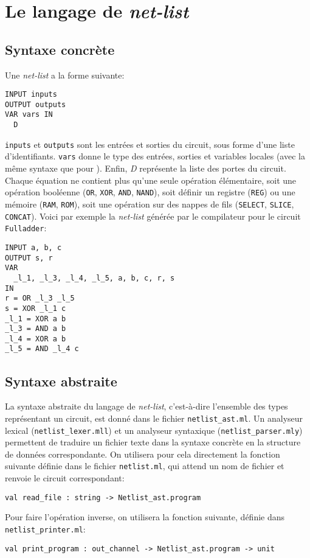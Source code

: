 \documentclass[a4paper]{article}
\begin{document}
\section{Le langage de \emph{net-list}}

\subsection{Syntaxe concrète}

Une \emph{net-list} a la forme suivante:
\begin{lstlisting}[language=nl]
INPUT inputs
OUTPUT outputs
VAR vars IN
  D
\end{lstlisting}
\texttt{inputs} et \texttt{outputs} sont les entrées et sorties du circuit, sous forme d'une liste d'identifiants. \texttt{vars} donne le type des entrées, sorties et variables locales (avec la même syntaxe que pour \minijazz{}). Enfin, \emph{D} représente la liste des portes du circuit. Chaque équation ne contient plus qu'une seule opération élémentaire, soit une opération booléenne (\texttt{OR}, \texttt{XOR}, \texttt{AND}, \texttt{NAND}), soit définir un registre (\texttt{REG}) ou une mémoire (\texttt{RAM}, \texttt{ROM}), soit une opération sur des nappes de fils (\texttt{SELECT}, \texttt{SLICE}, \texttt{CONCAT}). Voici par exemple la \emph{net-list} générée par le compilateur pour le circuit \texttt{Fulladder}:
\begin{lstlisting}
INPUT a, b, c
OUTPUT s, r
VAR
  _l_1, _l_3, _l_4, _l_5, a, b, c, r, s
IN
r = OR _l_3 _l_5
s = XOR _l_1 c
_l_1 = XOR a b
_l_3 = AND a b
_l_4 = XOR a b
_l_5 = AND _l_4 c
\end{lstlisting}

\subsection{Syntaxe abstraite}

La syntaxe abstraite du langage de \emph{net-list}, c'est-à-dire l'ensemble 
des types représentant un circuit, est donné dans le fichier 
\texttt{netlist\_ast.ml}. Un analyseur lexical (\texttt{netlist\_lexer.mll}) 
et un analyseur syntaxique (\texttt{netlist\_parser.mly}) permettent de 
traduire un fichier texte dans la syntaxe concrète en la structure de 
données correspondante. On utilisera pour cela directement la fonction 
suivante définie dans le fichier \texttt{netlist.ml}, qui attend un nom de 
fichier et renvoie le circuit correspondant:
\begin{lstlisting}[language={[objective]caml}]
val read_file : string -> Netlist_ast.program
\end{lstlisting}

Pour faire l'opération inverse, on utilisera la fonction suivante, définie dans \texttt{netlist\_printer.ml}:
\begin{lstlisting}[language={[objective]caml}, xrightmargin=0.5cm]
val print_program : out_channel -> Netlist_ast.program -> unit
\end{lstlisting}
\end{document}
